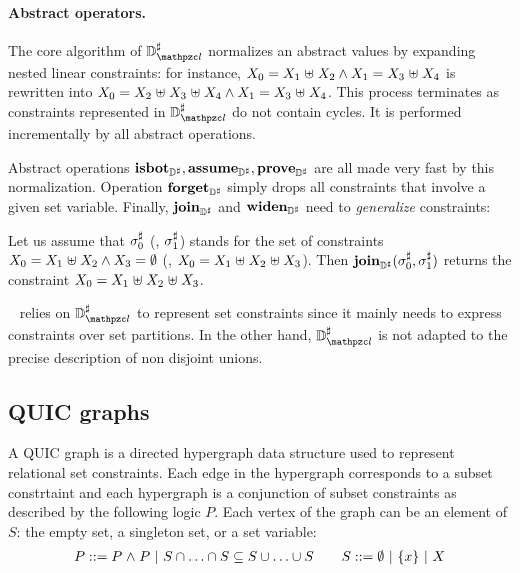\paragraph{Abstract operators.}
The core algorithm of \( \adomlin \) normalizes an abstract values by
expanding nested linear constraints:
for instance, \( X_0 = X_1 \mathrel{\uplus} X_2 \wedge X_1
= X_3 \mathrel{\uplus} X_4 \) is rewritten into  \( X_0 = X_2
\mathrel{\uplus} X_3 \mathrel{\uplus} X_4 \wedge X_1 = X_3 \mathrel{\uplus}
X_4 \).
This process terminates as constraints represented in \( \adomlin \)
do not contain cycles.
It is performed incrementally by all abstract operations.

Abstract operations \( \textbf{isbot}_{{\mathbb{D}}^{\sharp}}, \textbf{assume}_{{\mathbb{D}}^{\sharp}}, \textbf{prove}_{{\mathbb{D}}^{\sharp}} \) are all
made very fast by this normalization.
Operation \( \textbf{forget}_{{\mathbb{D}}^{\sharp}} \) simply drops all constraints that involve
a given set variable.
Finally, \( \textbf{join}_{{\mathbb{D}}^{\sharp}} \) and \( \textbf{widen}_{{\mathbb{D}}^{\sharp}} \) need to {\em generalize}
constraints:
\begin{example}[]
  Let us assume that \( {\sigma}^{\sharp}_0 \) (\resp, \( {\sigma}^{\sharp}_1 \)) stands for
  the set of constraints \( X_0 = X_1 \mathrel{\uplus} X_2
  \wedge X_3 = \emptyset \) (\resp, \( X_0 = X_1 \mathrel{\uplus}
  X_2 \mathrel{\uplus} X_3 \)).
  Then \( \textbf{join}_{{\mathbb{D}}^{\sharp}}( {\sigma}^{\sharp}_0, {\sigma}^{\sharp}_1 ) \) returns the constraint
  \( X_0 = X_1 \mathrel{\uplus} X_2 \mathrel{\uplus} X_3 \).
\end{example}
\memcad~\cite{memcad:15:sas} relies on \( \adomlin \) to represent set
constraints since it mainly needs to express constraints over set
partitions.
In the other hand, \( \adomlin \) is not adapted to the precise
description of non disjoint unions.

\subsection{QUIC graphs}
\label{s:4:2:quic}

A QUIC graph is a directed hypergraph data structure used to represent relational set constraints.  Each edge in the hypergraph corresponds to a subset constrtaint and each hypergraph is a conjunction of subset constraints as described by the following logic $P$.  Each vertex of the graph can be an element of $S$: the empty set, a singleton set, or a set variable:
\begin{align*}
  P ::= P \mathrel{\wedge} P \ | \ S \cap \ldots \cap S \subseteq S \cup \ldots \cup S \qquad
  S ::= \emptyset \ | \ \{x\} \ | \ X
\end{align*}

